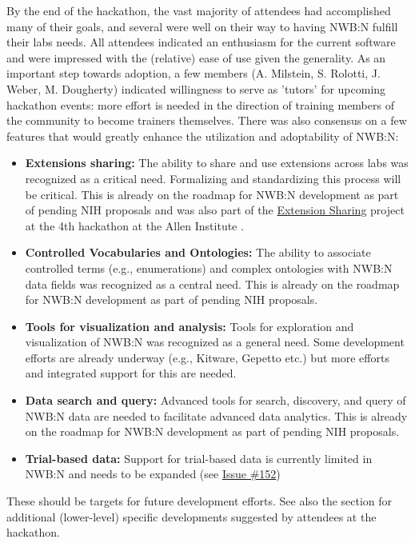 \documentclass{article}
\begin{document}
By the end of the hackathon, the vast majority of attendees had accomplished many of their goals,
and several were well on their way to having NWB:N fulfill their labs needs. All attendees 
indicated an enthusiasm for the current software and were impressed with the (relative) ease
of use given the generality. As an important step towards adoption, a few members 
(A. Milstein, S. Rolotti, J. Weber, M. Dougherty) indicated 
willingness to serve as 'tutors' for upcoming hackathon events: more effort is needed in the direction
of training members of the community to become trainers themselves. There was also consensus on 
a few features that would greatly enhance the utilization and adoptability of NWB:N:
\begin{itemize}
  \setlength\itemsep{0cm}
  \item \textbf{Extensions sharing:} The ability to share and use extensions across labs was recognized
  as a critical need. Formalizing and standardizing this process will be critical. This is already on
  the roadmap for NWB:N development as part of pending NIH proposals and was also part of the
  \href{https://neurodatawithoutborders.github.io/nwb_hackathons/HCK04_2018_Seattle/Projects/ExtensionSharing/}{Extension Sharing} project at the 4th hackathon at the Allen Institute . 
  \item \textbf{Controlled Vocabularies and Ontologies:} The ability to associate controlled terms 
   (e.g., enumerations) and complex ontologies with NWB:N data fields was recognized as a central need. 
   This is already on the roadmap for NWB:N development as part of pending NIH proposals. 
  \item \textbf{Tools for visualization and analysis:} Tools for exploration and
  visualization of NWB:N was recognized as a general need. Some development efforts are already 
  underway (e.g., Kitware, Gepetto etc.) but more efforts and integrated support for this are needed. 
  \item \textbf{Data search and query:} Advanced tools for search, discovery, and query of NWB:N
  data are needed to facilitate advanced data analytics. This is already on the roadmap for 
  NWB:N development as part of pending NIH proposals.
  \item \textbf{Trial-based data:} Support for trial-based data is currently limited in NWB:N
  and needs to be expanded (see \href{https://github.com/NeurodataWithoutBorders/nwb-schema/issues/152}{Issue \#152})
\end{itemize}
These should be targets for future development efforts. See also the  section
for additional (lower-level) specific developments suggested by attendees at the hackathon.
\end{document}
